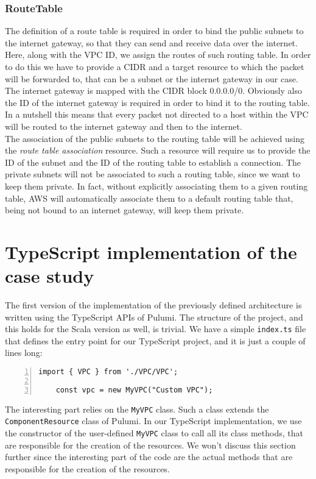 \subsubsection{RouteTable}
\label{sssec:routetable}
The definition of a route table is required in order to bind the public subnets to the internet gateway, so that they can send and receive data over the internet.\\
Here, along with the VPC ID, we assign the routes of such routing table.
In order to do this we have to provide a CIDR and a target resource to which the packet will be forwarded to, that can be a subnet or the internet gateway in our case.
The internet gateway is mapped with the CIDR block 0.0.0.0/0.
Obviously also the ID of the internet gateway is required in order to bind it to the routing table.\\
In a nutshell this means that every packet not directed to a host within the VPC will be routed to the internet gateway and then to the internet.\\
The association of the public subnets to the routing table will be achieved using the \textit{route table association} resource.
Such a resource will require us to provide the ID of the subnet and the ID of the routing table to establish a connection.
The private subnets will not be associated to such a routing table, since we want to keep them private.
In fact, without explicitly associating them to a given routing table, AWS will automatically associate them to a default routing table that, being not bound to an internet gateway, will keep them private.\\


\section{TypeScript implementation of the case study}
\label{sec:typescript-impl}
The first version of the implementation of the previously defined architecture is written using the TypeScript APIs of Pulumi.
The structure of the project, and this holds for the Scala version as well, is trivial.
We have a simple \texttt{index.ts} file that defines the entry point for our TypeScript project, and it is just a couple of lines long:\\
\begin{minipage}{\linewidth}
\begin{lstlisting}[numbers=left, numberstyle=\tiny, numbersep=-5pt, stepnumber=1]
    import { VPC } from './VPC/VPC';
  
    const vpc = new MyVPC("Custom VPC");
  \end{lstlisting}
\end{minipage}
The interesting part relies on the \texttt{MyVPC} class.
Such a class extends the \texttt{ComponentResource} class of Pulumi.
In our TypeScript implementation, we use the constructor of the user-defined \texttt{MyVPC} class to call all its class methods, that are responsible for the creation of the resources.
We won't discuss this section further since the interesting part of the code are the actual methods that are responsible for the creation of the resources.


